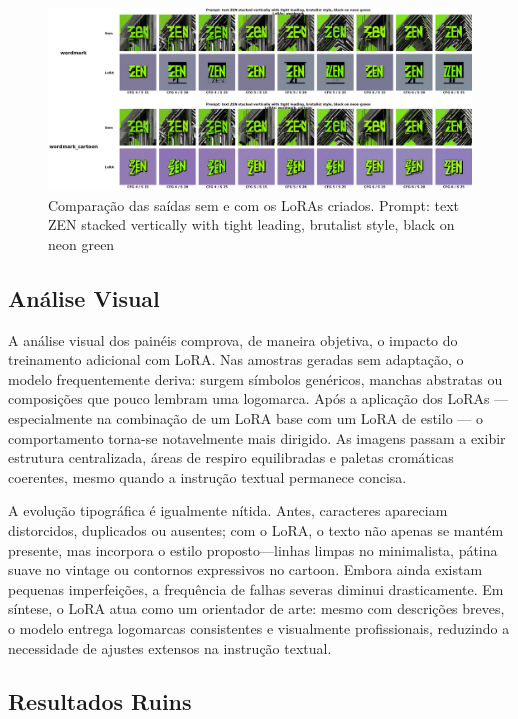 \documentclass[12pt, %
openright, 
oneside, %
a4paper,    %
brazil]{facom-ufu-abntex2}
\begin{document}
\begin{figure}[H]
    \centering
    \includegraphics[width=1.0\linewidth]{figuras/resultados/good/wordmark/cmp_p5_batch1.png}
    \caption[10º Comparação das saídas sem e com os LoRAs criados.]{Comparação das saídas sem e com os LoRAs criados. Prompt: text ZEN stacked vertically with tight leading, brutalist style, black on neon green}
    \label{fig:wordmarkCmpP5Batch1}
\end{figure}

\subsection{Análise Visual}

A análise visual dos painéis comprova, de maneira objetiva, o impacto do treinamento adicional com LoRA. Nas amostras geradas sem adaptação, o modelo frequentemente deriva: surgem símbolos genéricos, manchas abstratas ou composições que pouco lembram uma logomarca. Após a aplicação dos LoRAs — especialmente na combinação de um LoRA base com um LoRA de estilo — o comportamento torna-se notavelmente mais dirigido. As imagens passam a exibir estrutura centralizada, áreas de respiro equilibradas e paletas cromáticas coerentes, mesmo quando a instrução textual permanece concisa.

A evolução tipográfica é igualmente nítida. Antes, caracteres apareciam distorcidos, duplicados ou ausentes; com o LoRA, o texto não apenas se mantém presente, mas incorpora o estilo proposto—linhas limpas no minimalista, pátina suave no vintage ou contornos expressivos no cartoon. Embora ainda existam pequenas imperfeições, a frequência de falhas severas diminui drasticamente. Em síntese, o LoRA atua como um orientador de arte: mesmo com descrições breves, o modelo entrega logomarcas consistentes e visualmente profissionais, reduzindo a necessidade de ajustes extensos na instrução textual.

\subsection{Resultados Ruins}
\end{document}
